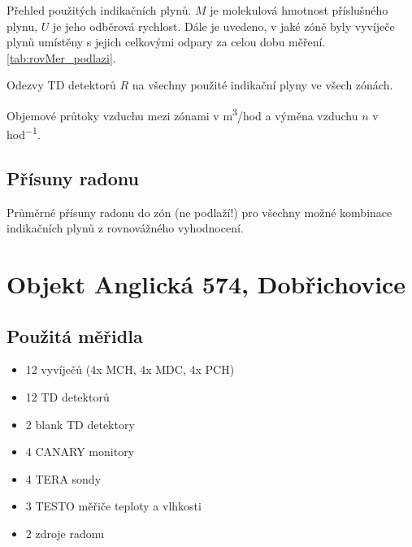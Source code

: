 \begin{table}[H]
    \centering
    \caption{Přehled použitých indikačních plynů. $M$ je molekulová hmotnost příslušného plynu, $U$ je jeho odběrová rychlost. Dále je uvedeno, v jaké zóně byly vyvíječe plynů umístěny s jejich celkovými odpary za celou dobu měření. \ref{tab:rovMer_podlazi}.}
    \label{tab:halkova980_indikacniPlyny}
    
\end{table}
\begin{table}[H]
    \centering
    \caption{Odezvy TD detektorů $R$ na všechny použité indikační plyny ve všech zónách.}
    \label{tab:halkova980_odezvyTD}
    
\end{table}

\begin{table}[H]
    \centering
    \caption{Objemové průtoky vzduchu mezi zónami v \si{m^3/hod} a výměna vzduchu $n$ v \si{hod^{-1}}.}
    \label{tab:halkova980_prutoky}
    
\end{table}

\subsection{Přísuny radonu}

\begin{table}[H]
    \centering
    \caption{Průměrné přísuny radonu do zón (ne podlaží!) pro všechny možné kombinace indikačních plynů z rovnovážného vyhodnocení.}
    \label{tab:halkova980_prisunyRovnovazne}
    
\end{table}

\section{Objekt Anglická 574, Dobřichovice}

\subsection{Použitá měřidla}
\begin{itemize}
    \setlength\itemsep{0em}
	\item 12 vyvíječů (4x MCH, 4x MDC, 4x PCH)
	\item 12 TD detektorů
	\item 2 blank TD detektory 
	\item 4 CANARY monitory
	\item 4 TERA sondy
	\item 3 TESTO měřiče teploty a vlhkosti
	\item 2 zdroje radonu
\end{itemize}

